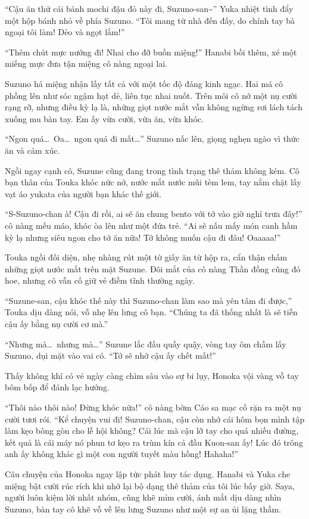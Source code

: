 \documentclass[../main.tex]{subfiles}
\begin{document}
``Cậu ăn thử cái bánh mochi đậu đỏ này đi, Suzuno-san\~{}'' Yuka nhiệt tình đẩy một hộp bánh nhỏ về phía Suzuno. ``Tôi mang từ nhà đến đấy, do chính tay bà ngoại tôi làm! Dẻo và ngọt lắm!''

``Thêm chút mực nướng đi! Nhai cho đỡ buồn miệng!'' Hanabi bồi thêm, xé một miếng mực đưa tận miệng cô nàng ngoại lai.

Suzuno há miệng nhận lấy tất cả với một tốc độ đáng kinh ngạc. Hai má cô phồng lên như sóc ngậm hạt dẻ, liên tục nhai nuốt. Trên môi cô nở một nụ cười rạng rỡ, nhưng điều kỳ lạ là, những giọt nước mắt vẫn không ngừng rơi lách tách xuống mu bàn tay. Em ấy vừa cười, vừa ăn, vừa khóc.

``Ngon quá\dots\ Oa\dots\ ngon quá đi mất\dots'' Suzuno nấc lên, giọng nghẹn ngào vì thức ăn và cảm xúc.

Ngồi ngay cạnh cô, Suzune cũng đang trong tình trạng thê thảm không kém. Cô bạn thân của Touka khóc nức nở, nước mắt nước mũi tèm lem, tay nắm chặt lấy vạt áo yukata của người bạn khác thế giới.

``S-Suzuno-chan à! Cậu đi rồi, ai sẽ ăn chung bento với tớ vào giờ nghỉ trưa đây!'' cô nàng mếu máo, khóc òa lên như một đứa trẻ. ``Ai sẽ nấu mấy món canh hầm kỳ lạ nhưng siêu ngon cho tớ ăn nữa! Tớ không muốn cậu đi đâu! Oaaaaa!''

Touka ngồi đối diện, nhẹ nhàng rút một tờ giấy ăn từ hộp ra, cẩn thận chấm những giọt nước mắt trên mặt Suzune. Đôi mắt của cô nàng Thần đồng cũng đỏ hoe, nhưng cô vẫn cố giữ vẻ điềm tĩnh thường ngày.

``Suzune-san, cậu khóc thế này thì Suzuno-chan làm sao mà yên tâm đi được,'' Touka dịu dàng nói, vỗ nhẹ lên lưng cô bạn. ``Chúng ta đã thống nhất là sẽ tiễn cậu ấy bằng nụ cười cơ mà.''

``Nhưng mà\dots\ nhưng mà\dots'' Suzune lắc đầu quầy quậy, vòng tay ôm chầm lấy Suzuno, dụi mặt vào vai cô. ``Tớ sẽ nhớ cậu ấy chết mất!''

Thấy không khí có vẻ ngày càng chìm sâu vào sự bi lụy, Honoka vội vàng vỗ tay bôm bốp để đánh lạc hướng.

``Thôi nào thôi nào! Đừng khóc nữa!'' cô nàng bờm Cáo sa mạc cố rặn ra một nụ cười tươi rói. ``Kể chuyện vui đi! Suzuno-chan, cậu còn nhớ cái hôm bọn mình tập làm kẹo bông gòn cho lễ hội không? Cái lúc mà cậu lỡ tay cho quá nhiều đường, kết quả là cái máy nó phun tơ kẹo ra trùm kín cả đầu Kuon-san ấy! Lúc đó trông anh ấy không khác gì một con người tuyết màu hồng! Hahaha!''

Câu chuyện của Honoka ngay lập tức phát huy tác dụng. Hanabi và Yuka che miệng bật cười rúc rích khi nhớ lại bộ dạng thê thảm của tôi lúc bấy giờ. Saya, người luôn kiệm lời nhất nhóm, cũng khẽ mỉm cười, ánh mắt dịu dàng nhìn Suzuno, bàn tay cô khẽ vỗ về lên lưng Suzuno như một sự an ủi lặng thầm.
\end{document}
